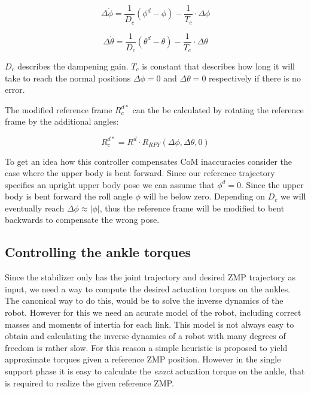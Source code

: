 \documentclass[english,ngerman]{KITreprt}
\begin{document}
\begin{equation} \label{eq:chest-dampening-roll}
\Delta \dot{\phi} = \frac{1}{D_c} (\phi^d - \phi) - \frac{1}{T_c} \cdot \Delta \phi
\end{equation}

\begin{equation} \label{eq:chest-dampening-pitch}
\Delta \dot{\theta} = \frac{1}{D_c} (\theta^d - \theta) - \frac{1}{T_c} \cdot \Delta \theta
\end{equation}

$D_c$ describes the dampening gain. $T_c$ is constant that describes how
long it will take to reach the normal positions $\Delta \phi = 0$ and
$\Delta \theta = 0$ respectively if there is no error.

The modified reference frame $R^{d*}_c$ can the be calculated by
rotating the reference frame by the additional angles:

\begin{equation}
R^{d*}_c = R^d \cdot R_{RPY}(\Delta \phi, \Delta \theta, 0)
\end{equation}

To get an idea how this controller compensates CoM inaccuracies consider
the case where the upper body is bent forward. Since our reference
trajectory specifies an upright upper body pose we can assume that
$\phi^d = 0$. Since the upper body is bent forward the roll angle $\phi$
will be below zero. Depending on $D_c$ we will eventually reach
$\Delta \phi \approx |\phi|$, thus the reference frame will be modified
to bent backwards to compensate the wrong pose.

\subsection{Controlling the ankle
torques}\label{controlling-the-ankle-torques}

Since the stabilizer only has the joint trajectory and desired ZMP
trajectory as input, we need a way to compute the desired actuation
torques on the ankles. The canonical way to do this, would be to solve
the inverse dynamics of the robot. However for this we need an acurate
model of the robot, including correct masses and moments of intertia for
each link. This model is not always easy to obtain and calculating the
inverse dynamics of a robot with many degrees of freedom is rather slow.
For this reason a simple heuristic is proposed to yield approximate
torques given a reference ZMP position. However in the single support
phase it is easy to calculate the \emph{exact} actuation torque on the
ankle, that is required to realize the given reference ZMP.
\end{document}
